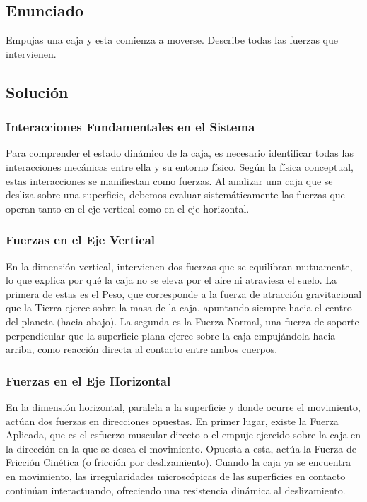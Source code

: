 \documentclass[12pt]{article}
\begin{document}
\newpage

\subsection*{Enunciado}
Empujas una caja y esta comienza a moverse. Describe todas las fuerzas que intervienen.

\subsection*{Solución}

\subsubsection*{Interacciones Fundamentales en el Sistema}
Para comprender el estado dinámico de la caja, es necesario identificar todas las interacciones mecánicas entre ella y su entorno físico. Según la física conceptual, estas interacciones se manifiestan como fuerzas. Al analizar una caja que se desliza sobre una superficie, debemos evaluar sistemáticamente las fuerzas que operan tanto en el eje vertical como en el eje horizontal.

\subsubsection*{Fuerzas en el Eje Vertical}
En la dimensión vertical, intervienen dos fuerzas que se equilibran mutuamente, lo que explica por qué la caja no se eleva por el aire ni atraviesa el suelo. La primera de estas es el Peso, que corresponde a la fuerza de atracción gravitacional que la Tierra ejerce sobre la masa de la caja, apuntando siempre hacia el centro del planeta (hacia abajo). La segunda es la Fuerza Normal, una fuerza de soporte perpendicular que la superficie plana ejerce sobre la caja empujándola hacia arriba, como reacción directa al contacto entre ambos cuerpos.

\subsubsection*{Fuerzas en el Eje Horizontal}
En la dimensión horizontal, paralela a la superficie y donde ocurre el movimiento, actúan dos fuerzas en direcciones opuestas. En primer lugar, existe la Fuerza Aplicada, que es el esfuerzo muscular directo o el empuje ejercido sobre la caja en la dirección en la que se desea el movimiento. Opuesta a esta, actúa la Fuerza de Fricción Cinética (o fricción por deslizamiento). Cuando la caja ya se encuentra en movimiento, las irregularidades microscópicas de las superficies en contacto continúan interactuando, ofreciendo una resistencia dinámica al deslizamiento.
\end{document}
